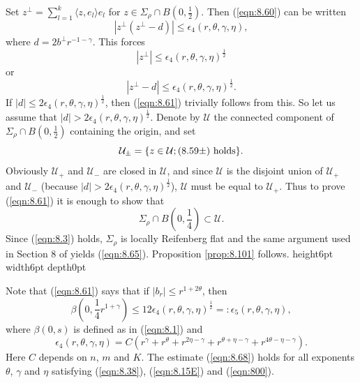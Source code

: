 \documentclass[12pt,leqno]{article}
\newcommand\qed{\hfill\vrule height6pt width6pt depth0pt}
\newcommand{\U}{\mathcal{U}}
\theoremstyle{plain}
\newenvironment{proof}{\medskip\noindent{\bf Proof: }\rmfamily}{\medskip}
\numberwithin{equation}{section}
\begin{document}
\begin{proof}
Set $z^{\perp}=\sum_{l=1}^k\langle z, e_l\rangle e_l$ for
$z\in\Sigma_\rho\cap B(0, \frac{1}{2})$.
Then (\ref{eqn:8.60}) can be written
\begin{equation}\label{eqn:8.62}
|z^{\perp}(z^{\perp}-d)|\le \epsilon_4(r,\theta,\gamma,\eta),
\end{equation}
where $d=2b^{\perp}r^{-1-\gamma}$. This forces
\begin{equation*}\label{eqn:8.63a}
|z^{\perp}|\le\epsilon_4(r,\theta,\gamma,\eta)^{\frac{1}{2}}\tag{8.59+}
\end{equation*}
or
\begin{equation*}\label{eqn:8.63b}
|z^{\perp}-d|\le\epsilon_4(r,\theta,\gamma,\eta)^{\frac{1}{2}}.\tag{8.59-}
\end{equation*}
If $|d|\le 2\epsilon_4(r,\theta,\gamma,\eta)^{\frac{1}{2}}$, then (\ref{eqn:8.61})
trivially follows from this. So let us assume that
$|d|>2\epsilon_4(r,\theta,\gamma,\eta)^{\frac{1}{2}}$. Denote by $\U$ the connected
component of $\Sigma_\rho\cap B(0, \frac{1}{2})$ containing the origin, and
set
\begin{equation}\label{eqn:8.64}
\U_\pm = \{z\in\U; \hbox{(8.59$\pm$) holds}\}.
\end{equation}
Obviously $\U_+$ and $\U_-$ are closed in $\U$, and since
$\U$ is the disjoint union of $\U_+$ and $\U_-$ (because
$|d|>2\epsilon_4(r,\theta,\gamma,\eta)^{\frac{1}{2}}$),
$\U$ must be equal to $\U_+$. Thus
to prove
(\ref{eqn:8.61}) it is enough to show that
\begin{equation}\label{eqn:8.65}
\Sigma_\rho\cap B(0, \frac{1}{4})\subset\U.
\end{equation}
Since (\ref{eqn:8.3}) holds, $\Sigma_\rho$
is locally Reifenberg flat and the same argument used in
Section 8 of \cite{DKT}
yields (\ref{eqn:8.65}). Proposition \ref{prop:8.101} follows. \qed
\end{proof}

\noindent Note that (\ref{eqn:8.61}) says that if $|b_r|\le
r^{1+2\theta}$, then
\begin{equation}\label{eqn:8.68}
 \beta(0, \frac{1}{4}r^{1+\gamma}) \le
12 \epsilon_4(r,\theta,\gamma,\eta)^{\frac{1}{2}}=:
\epsilon_5(r,\theta,\gamma,\eta),
\end{equation}
where $\beta(0,s)$ is defined as in (\ref{eqn:8.1})
and
\begin{equation}\label{eqn:8.68A}
\epsilon_4(r,\theta,\gamma,\eta)
=C
(r^{\gamma}+r^\theta +r^{2\eta-\gamma}
+ r^{\theta+\eta-\gamma} + r^{4\theta-\eta-\gamma}).
\end{equation}
Here $C$ depends on $n$, $m$ and $K$.
The estimate (\ref{eqn:8.68}) holds for all
exponents $\theta$, $\gamma$ and $\eta$ satisfying
(\ref{eqn:8.38}), (\ref{eqn:8.15E}) and (\ref{eqn:800}).
\end{document}
